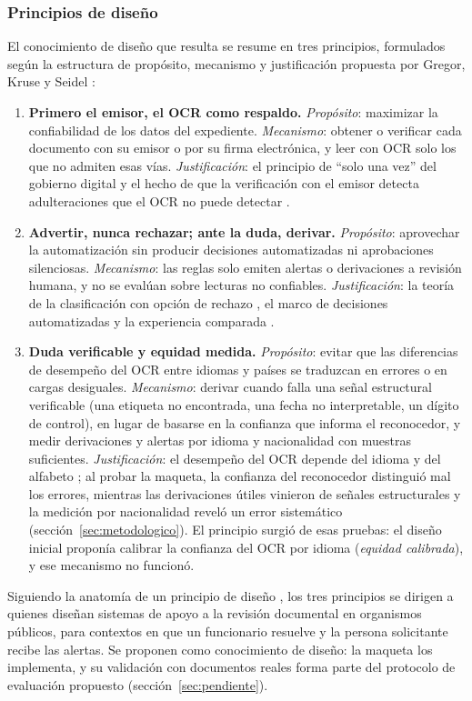 \documentclass[11pt,a4paper]{article}
\begin{document}
\subsubsection{Principios de diseño}
\label{sec:principios}
El conocimiento de diseño que resulta se resume en tres principios, formulados según la estructura de propósito, mecanismo y justificación propuesta por Gregor, Kruse y Seidel \cite{gregor2020}:
\begin{enumerate}
  \item \textbf{Primero el emisor, el OCR como respaldo.} \emph{Propósito}: maximizar la confiabilidad de los datos del expediente. \emph{Mecanismo}: obtener o verificar cada documento con su emisor o por su firma electrónica, y leer con OCR solo los que no admiten esas vías. \emph{Justificación}: el principio de ``solo una vez'' del gobierno digital \cite{krimmer2017} y el hecho de que la verificación con el emisor detecta adulteraciones que el OCR no puede detectar \cite{das2026,cs2026}.
  \item \textbf{Advertir, nunca rechazar; ante la duda, derivar.} \emph{Propósito}: aprovechar la automatización sin producir decisiones automatizadas ni aprobaciones silenciosas. \emph{Mecanismo}: las reglas solo emiten alertas o derivaciones a revisión humana, y no se evalúan sobre lecturas no confiables. \emph{Justificación}: la teoría de la clasificación con opción de rechazo \cite{chow1970,geifman2017}, el marco de decisiones automatizadas \cite{ley21719,canada2019} y la experiencia comparada \cite{ircc2022}.
  \item \textbf{Duda verificable y equidad medida.} \emph{Propósito}: evitar que las diferencias de desempeño del OCR entre idiomas y países se traduzcan en errores o en cargas desiguales. \emph{Mecanismo}: derivar cuando falla una señal estructural verificable (una etiqueta no encontrada, una fecha no interpretable, un dígito de control), en lugar de basarse en la confianza que informa el reconocedor, y medir derivaciones y alertas por idioma y nacionalidad con muestras suficientes. \emph{Justificación}: el desempeño del OCR depende del idioma y del alfabeto \cite{hegghammer2022}; al probar la maqueta, la confianza del reconocedor distinguió mal los errores, mientras las derivaciones útiles vinieron de señales estructurales y la medición por nacionalidad reveló un error sistemático (sección~\ref{sec:metodologico}). El principio surgió de esas pruebas: el diseño inicial proponía calibrar la confianza del OCR por idioma (\emph{equidad calibrada}), y ese mecanismo no funcionó.
\end{enumerate}
Siguiendo la anatomía de un principio de diseño \cite{gregor2020}, los tres principios se dirigen a quienes diseñan sistemas de apoyo a la revisión documental en organismos públicos, para contextos en que un funcionario resuelve y la persona solicitante recibe las alertas. Se proponen como conocimiento de diseño: la maqueta los implementa, y su validación con documentos reales forma parte del protocolo de evaluación propuesto (sección~\ref{sec:pendiente}).
\end{document}
